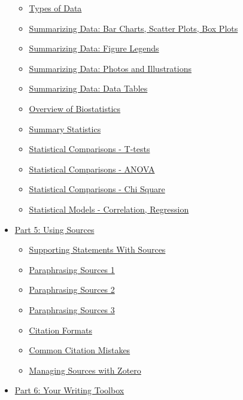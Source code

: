 \documentclass[
]{book}
\providecommand{\tightlist}{%
  \setlength{\itemsep}{0pt}\setlength{\parskip}{0pt}}
\begin{document}
\begin{itemize}
  \begin{itemize}
  \tightlist
  \item
    \protect\hyperlink{datatypes400}{Types of Data}
  \item
    \protect\hyperlink{chartsone425}{Summarizing Data: Bar Charts, Scatter Plots, Box Plots}
  \item
    \protect\hyperlink{chartstwo426}{Summarizing Data: Figure Legends}
  \item
    \protect\hyperlink{photos430}{Summarizing Data: Photos and Illustrations}
  \item
    \protect\hyperlink{tables435}{Summarizing Data: Data Tables}
  \item
    \protect\hyperlink{biostats450}{Overview of Biostatistics}
  \item
    \protect\hyperlink{sumstats460}{Summary Statistics}
  \item
    \protect\hyperlink{compstatsone470}{Statistical Comparisons - T-tests}
  \item
    \protect\hyperlink{compstatstwo473}{Statistical Comparisons - ANOVA}
  \item
    \protect\hyperlink{compstatsthree475}{Statistical Comparisons - Chi Square}
  \item
    \protect\hyperlink{models480}{Statistical Models - Correlation, Regression}
  \end{itemize}
\item
  \protect\hyperlink{sources500}{Part 5: Using Sources}

  \begin{itemize}
  \tightlist
  \item
    \protect\hyperlink{sourcearguments505}{Supporting Statements With Sources}
  \item
    \protect\hyperlink{paraphrasingone506}{Paraphrasing Sources 1}
  \item
    \protect\hyperlink{paraphrasingtwo507}{Paraphrasing Sources 2}
  \item
    \protect\hyperlink{paraphrasingthree508}{Paraphrasing Sources 3}
  \item
    \protect\hyperlink{citformats510}{Citation Formats}
  \item
    \protect\hyperlink{citmistakes515}{Common Citation Mistakes}
  \item
    \protect\hyperlink{zotero520}{Managing Sources with Zotero}
  \end{itemize}
\item
  \protect\hyperlink{toolbox600}{Part 6: Your Writing Toolbox}


\end{itemize}
\end{document}
